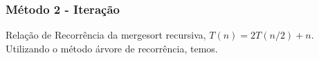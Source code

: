\subsubsection{Método 2 - Iteração}
Relação de Recorrência da mergesort recursiva, $T(n) = 2T(n/2) + n$. Utilizando o método árvore de recorrência, temos.
